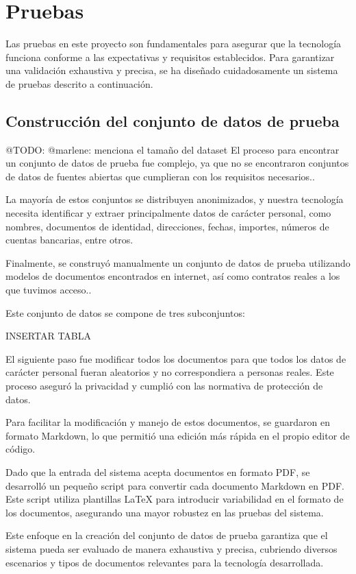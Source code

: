 \section{Pruebas}
Las pruebas en este proyecto son fundamentales para asegurar que la tecnología funciona conforme a las expectativas y
requisitos establecidos. Para garantizar una validación exhaustiva y precisa, se ha diseñado cuidadosamente un sistema
de pruebas descrito a continuación.

\subsection*{Construcción del conjunto de datos de prueba}

\colorbox{color_highlight}{@TODO: @marlene:} menciona el tamaño del dataset
El proceso para encontrar un conjunto de datos de prueba fue complejo, ya que no se encontraron conjuntos de datos de
fuentes abiertas que cumplieran con los requisitos necesarios..

La mayoría de estos conjuntos se distribuyen anonimizados, y nuestra tecnología necesita identificar y extraer
principalmente datos de carácter personal, como nombres, documentos de identidad, direcciones, fechas, importes, números
de cuentas bancarias, entre otros.

Finalmente, se construyó manualmente un conjunto de datos de prueba utilizando modelos de documentos encontrados en
internet, así como contratos reales a los que tuvimos acceso..

Este conjunto de datos se compone de tres subconjuntos:


INSERTAR TABLA

El siguiente paso fue modificar todos los documentos para que todos los datos de carácter personal fueran aleatorios y
no correspondiera a personas reales. Este proceso aseguró la privacidad y cumplió con las normativa de protección de
datos.

Para facilitar la modificación y manejo de estos documentos, se guardaron en formato Markdown, lo que permitió una
edición más rápida en el propio editor de código.

Dado que la entrada del sistema acepta documentos en formato PDF, se desarrolló un pequeño script para convertir cada
documento Markdown en PDF. Este script utiliza plantillas LaTeX para introducir variabilidad en el formato de los
documentos, asegurando una mayor robustez en las pruebas del sistema.


Este enfoque en la creación del conjunto de datos de prueba garantiza que el sistema pueda ser evaluado de manera
exhaustiva y precisa, cubriendo diversos escenarios y tipos de documentos relevantes para la tecnología desarrollada.


